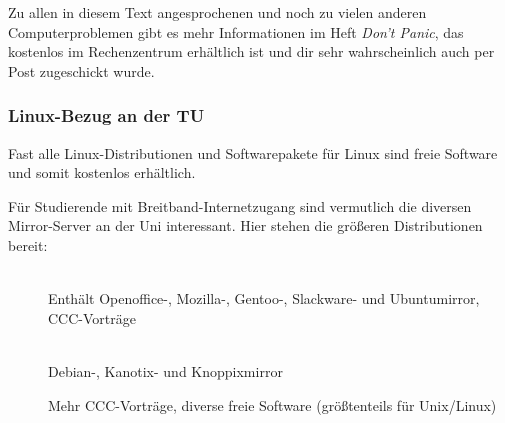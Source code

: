 		Zu allen in diesem Text angesprochenen und noch zu vielen anderen Computerproblemen gibt es mehr Informationen im Heft \emph{Don't Panic}, das kostenlos im Rechenzentrum erhältlich ist und dir sehr wahrscheinlich auch per Post zugeschickt wurde.

	\subsubsection{Linux-Bezug an der TU}
		Fast alle Linux-Distributionen und Softwarepakete für Linux sind freie Software und somit kostenlos erhältlich.

		Für Studierende mit Breitband-Internetzugang sind vermutlich die diversen Mirror-Server an der Uni interessant. Hier stehen die größeren Distributionen bereit:

		\begin{description}
			\item[]~\\Enthält Openoffice-, Mozilla-, Gentoo-, Slackware- und Ubuntumirror, CCC-Vorträge
			\item[]~\\Debian-, Kanotix- und Knoppixmirror
			\item[] Mehr CCC-Vorträge, diverse freie Software (größtenteils für Unix/Linux)
		\end{description}

